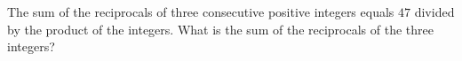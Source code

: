 The sum of the reciprocals of three consecutive positive integers equals $47$ divided by the product of the integers. What is the sum of the reciprocals of the three integers?
